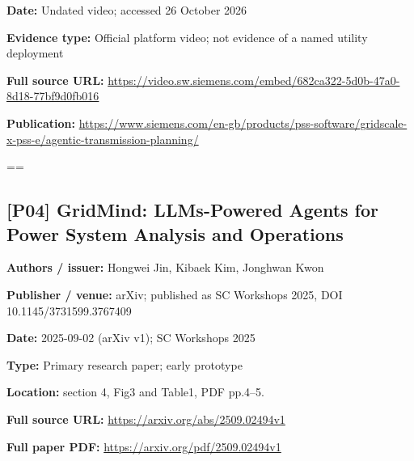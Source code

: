 \documentclass[10pt,letterpaper]{article}
\begin{document}
\textbf{Date:} Undated video; accessed 26 October 2026\par
\textbf{Evidence type:} Official platform video; not evidence of a named utility deployment\par
\textbf{Full source URL:} \href{https://video.sw.siemens.com/embed/682ca322-5d0b-47a0-8d18-77bf9d0fb016}{\small\ttfamily https:/\allowbreak{}/\allowbreak{}video.\allowbreak{}sw.\allowbreak{}siemens.\allowbreak{}com/\allowbreak{}embed/\allowbreak{}682ca322-\allowbreak{}5d0b-\allowbreak{}47a0-\allowbreak{}8d18-\allowbreak{}77bf9d0fb016}\par
\textbf{Publication:} \href{https://www.siemens.com/en-gb/products/pss-software/gridscale-x-pss-e/agentic-transmission-planning/}{\small\ttfamily https:/\allowbreak{}/\allowbreak{}www.\allowbreak{}siemens.\allowbreak{}com/\allowbreak{}en-\allowbreak{}gb/\allowbreak{}products/\allowbreak{}pss-\allowbreak{}software/\allowbreak{}gridscale-\allowbreak{}x-\allowbreak{}pss-\allowbreak{}e/\allowbreak{}agentic-\allowbreak{}transmission-\allowbreak{}planning/\allowbreak{}}\par
\egroup\par\noindent\box\readingEntry\par\medskip
\setbox\readingEntry=\vbox\bgroup\hsize=\linewidth\subsection*{[P04] GridMind: LLMs-Powered Agents for Power System Analysis and Operations}
\textbf{Authors / issuer:} Hongwei Jin, Kibaek Kim, Jonghwan Kwon\par
\textbf{Publisher / venue:} arXiv; published as SC Workshops 2025, DOI 10.1145/3731599.3767409\par
\textbf{Date:} 2025-09-02 (arXiv v1); SC Workshops 2025\par
\textbf{Type:} Primary research paper; early prototype\par
\textbf{Location:} section 4, Fig3 and Table1, PDF pp.4--5.\par
\textbf{Full source URL:} \href{https://arxiv.org/abs/2509.02494v1}{\small\ttfamily https:/\allowbreak{}/\allowbreak{}arxiv.\allowbreak{}org/\allowbreak{}abs/\allowbreak{}2509.\allowbreak{}02494v1}\par
\textbf{Full paper PDF:} \href{https://arxiv.org/pdf/2509.02494v1}{\small\ttfamily https:/\allowbreak{}/\allowbreak{}arxiv.\allowbreak{}org/\allowbreak{}pdf/\allowbreak{}2509.\allowbreak{}02494v1}\par
\egroup\par\noindent\box\readingEntry\par\medskip
\end{document}
